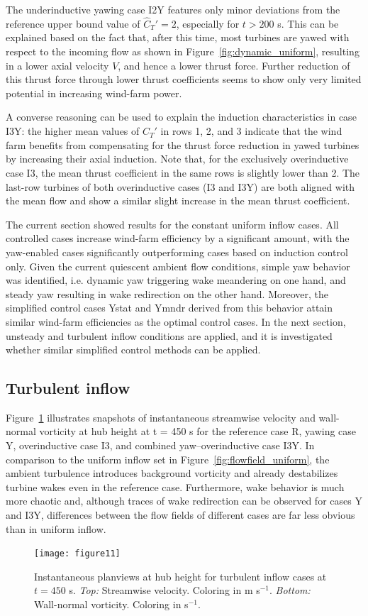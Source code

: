 \documentclass[energies,article,submit,moreauthors,latex,10pt,a4paper]{mdpi}
\newcommand{\revision}[1]{{\color{red} #1}}
\newcommand{\cthat}{\widehat{C}_T'}
\begin{document}
The underinductive yawing case I2Y features only minor deviations from the reference upper bound value of $\cthat = 2$, especially for $t > 200$ s. This can be explained based on the fact that, after this time, most turbines are yawed with respect to the incoming flow as shown in Figure~\ref{fig:dynamic_uniform}, resulting in a lower axial velocity $V$, and hence a lower thrust force. Further reduction of this thrust force through lower thrust coefficients seems to show only very limited potential in increasing wind-farm power. 

A converse reasoning can be used to explain the induction characteristics in case I3Y: the higher mean values of $\cthat$ in rows 1, 2, and 3 indicate that the wind farm benefits from compensating for the thrust force reduction in yawed turbines by increasing their axial induction. Note that, for the exclusively overinductive case I3, the mean thrust coefficient in the same rows is slightly lower than 2. The last-row turbines of both overinductive cases (I3 and I3Y) are both aligned with the mean flow and show a similar slight increase in the mean thrust coefficient. 

The current section showed results for the \revision{constant} uniform inflow cases. All controlled cases increase wind-farm efficiency by a significant amount, with the yaw-enabled cases significantly outperforming cases based on induction control only. Given the current quiescent ambient flow conditions, simple yaw behavior was identified, i.e. dynamic yaw triggering wake meandering on one hand, and steady yaw resulting in wake redirection on the other hand. Moreover, the simplified control cases Ystat and Ymndr derived from this behavior attain similar wind-farm efficiencies as the optimal control cases. In the next section, unsteady and turbulent inflow conditions are applied, and it is investigated whether similar simplified control methods can be applied.

\subsection{Turbulent inflow}\label{sec:opt_yaw_turb}
\noindent Figure~\ref{fig:flowfield_turb} illustrates snapshots of instantaneous streamwise velocity and wall-normal vorticity at hub height at t = 450 s for the reference case R, yawing case Y, overinductive case I3, and combined yaw--overinductive case I3Y. In comparison to the uniform inflow set in Figure~\ref{fig:flowfield_uniform}, the ambient turbulence introduces background vorticity and already destabilizes turbine wakes even in the reference case. Furthermore, wake behavior is much more chaotic and, although traces of wake redirection can be observed for cases Y and I3Y, differences between the flow fields of different cases are far less obvious than in uniform inflow. 
\begin{figure}
	\texttt{[image: figure11]}
	\caption{Instantaneous planviews at hub height for turbulent inflow cases at $t= 450$ s. \emph{Top: } Streamwise velocity. Coloring in m s$^{-1}$. \emph{Bottom: } Wall-normal vorticity. Coloring in s$^{-1}$. \label{fig:flowfield_turb}}
\end{figure}
\end{document}
